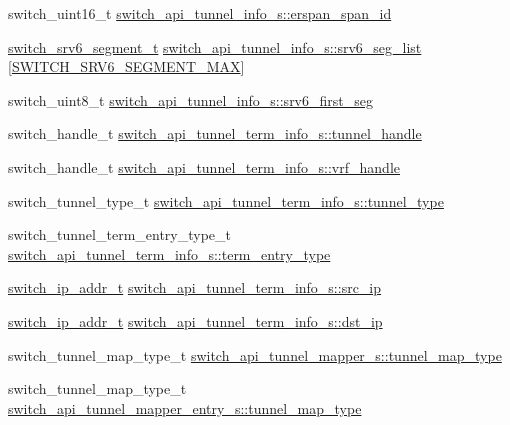 \begin{DoxyCompactItemize}
\item 
switch\+\_\+uint16\+\_\+t \hyperlink{group__Tunnel_gad06fec7740f72b2510bb540c7744792e}{switch\+\_\+api\+\_\+tunnel\+\_\+info\+\_\+s\+::erspan\+\_\+span\+\_\+id}
\item 
\hyperlink{group__Tunnel_ga58531f8a8bab6f7c34f9bd77c243ec2f}{switch\+\_\+srv6\+\_\+segment\+\_\+t} \hyperlink{group__Tunnel_ga14d1a11fe2372fe426867817ab8ddabc}{switch\+\_\+api\+\_\+tunnel\+\_\+info\+\_\+s\+::srv6\+\_\+seg\+\_\+list} \mbox{[}\hyperlink{group__Tunnel_ga7da56385741dd85fc62b0518245e0b06}{S\+W\+I\+T\+C\+H\+\_\+\+S\+R\+V6\+\_\+\+S\+E\+G\+M\+E\+N\+T\+\_\+\+M\+A\+X}\mbox{]}
\item 
switch\+\_\+uint8\+\_\+t \hyperlink{group__Tunnel_gaf87c6fecf6dff3564910928b7e8eea7a}{switch\+\_\+api\+\_\+tunnel\+\_\+info\+\_\+s\+::srv6\+\_\+first\+\_\+seg}
\item 
switch\+\_\+handle\+\_\+t \hyperlink{group__Tunnel_ga8741eaf6ce1e5362f4fe1a61fbb1b3a5}{switch\+\_\+api\+\_\+tunnel\+\_\+term\+\_\+info\+\_\+s\+::tunnel\+\_\+handle}
\item 
switch\+\_\+handle\+\_\+t \hyperlink{group__Tunnel_gad17881c029ef16dde1b3fdc6d66ad388}{switch\+\_\+api\+\_\+tunnel\+\_\+term\+\_\+info\+\_\+s\+::vrf\+\_\+handle}
\item 
switch\+\_\+tunnel\+\_\+type\+\_\+t \hyperlink{group__Tunnel_gaa35e1acc0835967b9202df9383e8a060}{switch\+\_\+api\+\_\+tunnel\+\_\+term\+\_\+info\+\_\+s\+::tunnel\+\_\+type}
\item 
switch\+\_\+tunnel\+\_\+term\+\_\+entry\+\_\+type\+\_\+t \hyperlink{group__Tunnel_ga3d6d200a504a59a4075506ccc5afaebe}{switch\+\_\+api\+\_\+tunnel\+\_\+term\+\_\+info\+\_\+s\+::term\+\_\+entry\+\_\+type}
\item 
\hyperlink{structswitch__ip__addr__s}{switch\+\_\+ip\+\_\+addr\+\_\+t} \hyperlink{group__Tunnel_gae3eaebd60a50c2437066dace61929bd5}{switch\+\_\+api\+\_\+tunnel\+\_\+term\+\_\+info\+\_\+s\+::src\+\_\+ip}
\item 
\hyperlink{structswitch__ip__addr__s}{switch\+\_\+ip\+\_\+addr\+\_\+t} \hyperlink{group__Tunnel_ga82dc368b7c3f3663420f3c1b41a04880}{switch\+\_\+api\+\_\+tunnel\+\_\+term\+\_\+info\+\_\+s\+::dst\+\_\+ip}
\item 
switch\+\_\+tunnel\+\_\+map\+\_\+type\+\_\+t \hyperlink{group__Tunnel_gaabdc00f1db835c1e46b0c8c8054d6d5e}{switch\+\_\+api\+\_\+tunnel\+\_\+mapper\+\_\+s\+::tunnel\+\_\+map\+\_\+type}
\item 
switch\+\_\+tunnel\+\_\+map\+\_\+type\+\_\+t \hyperlink{group__Tunnel_ga64713ea1034e8583ee43f1d811e03eba}{switch\+\_\+api\+\_\+tunnel\+\_\+mapper\+\_\+entry\+\_\+s\+::tunnel\+\_\+map\+\_\+type}

\end{DoxyCompactItemize}

